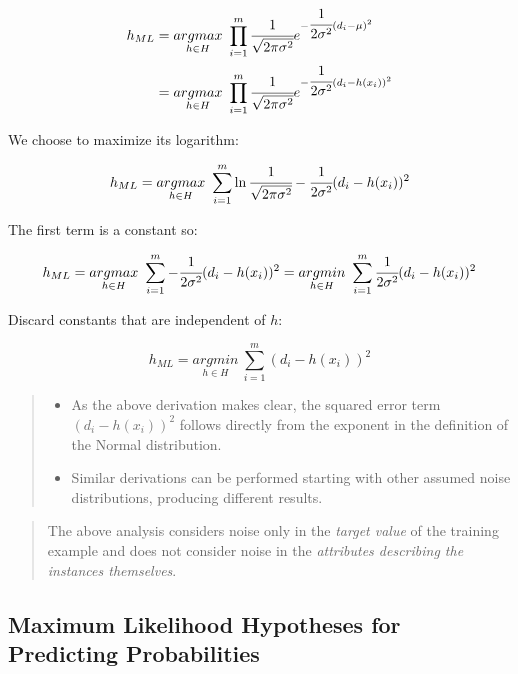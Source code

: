 \begin{equation*}
\begin{aligned}
h_{ML}&=\underset{h\in H}{argmax}\ \prod_{i=1}^{m}\cfrac{1}{\sqrt{2\pi\sigma^2}}e^{-\cfrac{1}{2\sigma^2}(d_i-\mu)^2}\\
&=\underset{h\in H}{argmax}\ \prod_{i=1}^{m}\cfrac{1}{\sqrt{2\pi\sigma^2}}e^{-\cfrac{1}{2\sigma^2}(d_i-h(x_i))^2}
\end{aligned}
\end{equation*}


We choose to maximize its logarithm:

\[h_{ML}=\underset{h\in H}{argmax}\ \sum_{i=1}^{m}\ln\cfrac{1}{\sqrt{2\pi\sigma^2}}-\cfrac{1}{2\sigma^2}(d_i-h(x_i))^2\]

The first term is a constant so:

\[h_{ML}=\underset{h\in H}{argmax}\ \sum_{i=1}^{m}-\cfrac{1}{2\sigma^2}(d_i-h(x_i))^2\\
=\underset{h\in H}{argmin}\ \sum_{i=1}^{m}\cfrac{1}{2\sigma^2}(d_i-h(x_i))^2\]

Discard constants that are independent of \(h\):

\[h_{ML}=\underset{h\in H}{argmin}\ \sum_{i=1}^{m}(d_i-h(x_i))^2\]

\begin{quote}
\begin{itemize}
\item
  As the above derivation makes clear, the squared error term
  \((d_i-h(x_i))^2\) follows directly from the exponent in the
  definition of the Normal distribution.
\item
  Similar derivations can be performed starting with other assumed noise
  distributions, producing different results.
\end{itemize}
\end{quote}

\begin{quote}
The above analysis considers noise only in the \emph{target value} of
the training example and does not consider noise in the \emph{attributes
describing the instances themselves}.
\end{quote}

\hypertarget{maximum-likelihood-hypotheses-for-predicting-probabilities}{%
\subsection{Maximum Likelihood Hypotheses for Predicting
Probabilities}\label{maximum-likelihood-hypotheses-for-predicting-probabilities}}

